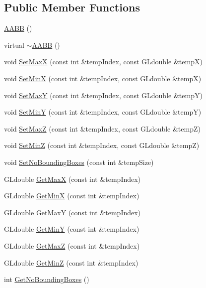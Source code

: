 \subsection*{Public Member Functions}
\begin{DoxyCompactItemize}
\item 
\hyperlink{class_a_a_b_b_a5f5baf6c533905aa1456b3a3eb57bab2}{A\+A\+BB} ()
\item 
virtual \hyperlink{class_a_a_b_b_a1c8a263cbd356446535e88b521eab3d5}{$\sim$\+A\+A\+BB} ()
\item 
void \hyperlink{class_a_a_b_b_a49aefcac8e9b33ef4508f220d551e9a3}{Set\+MaxX} (const int \&temp\+Index, const G\+Ldouble \&tempX)
\item 
void \hyperlink{class_a_a_b_b_a38ecdedc213500ce61a1caa9ad0b1468}{Set\+MinX} (const int \&temp\+Index, const G\+Ldouble \&tempX)
\item 
void \hyperlink{class_a_a_b_b_af5f3fe38dd9aaf9ba1aa81c119b4beaa}{Set\+MaxY} (const int \&temp\+Index, const G\+Ldouble \&tempY)
\item 
void \hyperlink{class_a_a_b_b_a1cba0f0ef073d176fcffd58344668c6a}{Set\+MinY} (const int \&temp\+Index, const G\+Ldouble \&tempY)
\item 
void \hyperlink{class_a_a_b_b_a3b5c15b7a3330384d08b4ad1a8c87903}{Set\+MaxZ} (const int \&temp\+Index, const G\+Ldouble \&tempZ)
\item 
void \hyperlink{class_a_a_b_b_a97f330cb047e00b160cee87301b8ac23}{Set\+MinZ} (const int \&temp\+Index, const G\+Ldouble \&tempZ)
\item 
void \hyperlink{class_a_a_b_b_a4bbff0661c754b621c4b6bfc89bcf051}{Set\+No\+Bounding\+Boxes} (const int \&temp\+Size)
\item 
G\+Ldouble \hyperlink{class_a_a_b_b_a96d56ed1be5ba2a151b82c508d9149a2}{Get\+MaxX} (const int \&temp\+Index)
\item 
G\+Ldouble \hyperlink{class_a_a_b_b_a54aa8d1616469816102925c93cd7c195}{Get\+MinX} (const int \&temp\+Index)
\item 
G\+Ldouble \hyperlink{class_a_a_b_b_a1e4dc54e528b14528968b6aa9e347eea}{Get\+MaxY} (const int \&temp\+Index)
\item 
G\+Ldouble \hyperlink{class_a_a_b_b_a1177a0ebf40f7f3545f834f99c73c0f6}{Get\+MinY} (const int \&temp\+Index)
\item 
G\+Ldouble \hyperlink{class_a_a_b_b_a8f39211bf0b803194058797bcb06450c}{Get\+MaxZ} (const int \&temp\+Index)
\item 
G\+Ldouble \hyperlink{class_a_a_b_b_aaa4d9cd90b1f8890b9c678a2d33fb693}{Get\+MinZ} (const int \&temp\+Index)
\item 
int \hyperlink{class_a_a_b_b_a65be20483d52ea207e9569244c5fb1c4}{Get\+No\+Bounding\+Boxes} ()
\end{DoxyCompactItemize}
